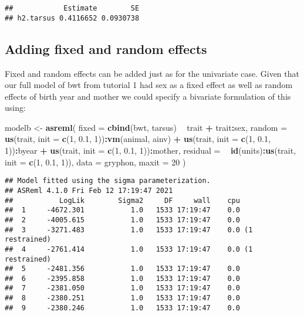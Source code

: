\documentclass[12pt,]{book}
\newenvironment{Shaded}{\begin{snugshade}}{\end{snugshade}}
\newcommand{\DataTypeTok}[1]{\textcolor[rgb]{0.13,0.29,0.53}{#1}}
\newcommand{\DecValTok}[1]{\textcolor[rgb]{0.00,0.00,0.81}{#1}}
\newcommand{\FloatTok}[1]{\textcolor[rgb]{0.00,0.00,0.81}{#1}}
\newcommand{\KeywordTok}[1]{\textcolor[rgb]{0.13,0.29,0.53}{\textbf{#1}}}
\newcommand{\NormalTok}[1]{#1}
\newcommand{\OperatorTok}[1]{\textcolor[rgb]{0.81,0.36,0.00}{\textbf{#1}}}
\newcommand{\StringTok}[1]{\textcolor[rgb]{0.31,0.60,0.02}{#1}}
\begin{document}
\begin{verbatim}
##            Estimate        SE
## h2.tarsus 0.4116652 0.0930738
\end{verbatim}

\hypertarget{adding-fixed-and-random-effects}{%
\subsection{Adding fixed and random effects}\label{adding-fixed-and-random-effects}}

Fixed and random effects can be added just as for the univariate case. Given that our full model of bwt from tutorial 1 had sex as a fixed effect as well as random effects of birth year and mother we could specify a bivariate formulation of this using:

\begin{Shaded}
\begin{Highlighting}[]
\NormalTok{modelb <-}\StringTok{ }\KeywordTok{asreml}\NormalTok{(}
  \DataTypeTok{fixed =} \KeywordTok{cbind}\NormalTok{(bwt, tarsus) }\OperatorTok{~}\StringTok{ }\NormalTok{trait }\OperatorTok{+}\StringTok{ }\NormalTok{trait}\OperatorTok{:}\NormalTok{sex,}
  \DataTypeTok{random =} \OperatorTok{~}\StringTok{ }\KeywordTok{us}\NormalTok{(trait, }\DataTypeTok{init =} \KeywordTok{c}\NormalTok{(}\DecValTok{1}\NormalTok{, }\FloatTok{0.1}\NormalTok{, }\DecValTok{1}\NormalTok{))}\OperatorTok{:}\KeywordTok{vm}\NormalTok{(animal, ainv) }\OperatorTok{+}
\StringTok{    }\KeywordTok{us}\NormalTok{(trait, }\DataTypeTok{init =} \KeywordTok{c}\NormalTok{(}\DecValTok{1}\NormalTok{, }\FloatTok{0.1}\NormalTok{, }\DecValTok{1}\NormalTok{))}\OperatorTok{:}\NormalTok{byear }\OperatorTok{+}
\StringTok{    }\KeywordTok{us}\NormalTok{(trait, }\DataTypeTok{init =} \KeywordTok{c}\NormalTok{(}\DecValTok{1}\NormalTok{, }\FloatTok{0.1}\NormalTok{, }\DecValTok{1}\NormalTok{))}\OperatorTok{:}\NormalTok{mother,}
  \DataTypeTok{residual =} \OperatorTok{~}\StringTok{ }\KeywordTok{id}\NormalTok{(units)}\OperatorTok{:}\KeywordTok{us}\NormalTok{(trait, }\DataTypeTok{init =} \KeywordTok{c}\NormalTok{(}\DecValTok{1}\NormalTok{, }\FloatTok{0.1}\NormalTok{, }\DecValTok{1}\NormalTok{)),}
  \DataTypeTok{data =}\NormalTok{ gryphon,}
  \DataTypeTok{maxit =} \DecValTok{20}
\NormalTok{)}
\end{Highlighting}
\end{Shaded}

\begin{verbatim}
## Model fitted using the sigma parameterization.
## ASReml 4.1.0 Fri Feb 12 17:19:47 2021
##           LogLik        Sigma2     DF     wall    cpu
##  1     -4672.301           1.0   1533 17:19:47    0.0
##  2     -4005.615           1.0   1533 17:19:47    0.0
##  3     -3271.483           1.0   1533 17:19:47    0.0 (1 restrained)
##  4     -2761.414           1.0   1533 17:19:47    0.0 (1 restrained)
##  5     -2481.356           1.0   1533 17:19:47    0.0
##  6     -2395.858           1.0   1533 17:19:47    0.0
##  7     -2381.050           1.0   1533 17:19:47    0.0
##  8     -2380.251           1.0   1533 17:19:47    0.0
##  9     -2380.246           1.0   1533 17:19:47    0.0
\end{verbatim}
\end{document}
